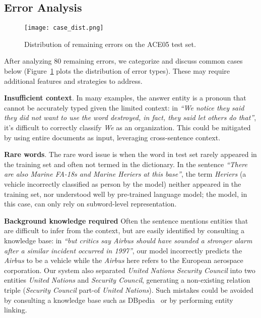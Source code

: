 \documentclass[11pt,a4paper]{article}
\begin{document}
\subsection{Error Analysis}
\label{section:analysis}

\begin{figure}[t]
\centering
\texttt{[image: case\_dist.png]}
\caption{Distribution of remaining errors on the ACE05 test set.}
\label{edist}
\end{figure}

After analyzing 80 remaining errors, we categorize and discuss common cases 
below (Figure~\ref{edist} plots the distribution of  error types). These  may require additional features and strategies to address. 



\noindent \textbf{Insufficient context}. In many examples, the answer entity is  a  pronoun that cannot be accurately typed given the limited  context: in \textit{``We notice they said they did not want to 
use the word destroyed, in fact, they said let others do that''}, it's 
difficult to correctly classify  \textit{We} as an 
organization. 
This  could be mitigated by using entire documents as input, leveraging cross-sentence context. 





\noindent \textbf{Rare words}. The rare word issue is when the word in test 
set rarely 
appeared in the training set and often not termed in the dictionary. In the sentence \textit{``There are 
also Marine FA-18s and 
Marine Heriers at this base''}, the term \textit{Heriers} (a vehicle incorrectly classified as person by the model) 
neither
appeared in the training set, nor understood well by pre-trained language 
model; the model, in this case, can only rely on subword-level representation.










\noindent \textbf{Background knowledge required} Often the sentence mentions entities that are difficult to infer from the context, but are easily identified by consulting a knowledge base: in \textit{``but critics say Airbus should have sounded a stronger alarm after a similar incident occurred in 1997''}, our model incorrectly predicts the \textit{Airbus} to be a vehicle while the \textit{Airbus} here refers to the European aerospace corporation. Our system also separated \textit{United Nations Security Council} into two entities \textit{United Nations} and \textit{Security Council}, generating a non-existing relation triple (\textit{Security Council} part-of \textit{United Nations}). Such mistakes could be avoided by consulting a knowledge base such as DBpedia~\cite{dbpedia} or by performing entity linking. 
\end{document}
